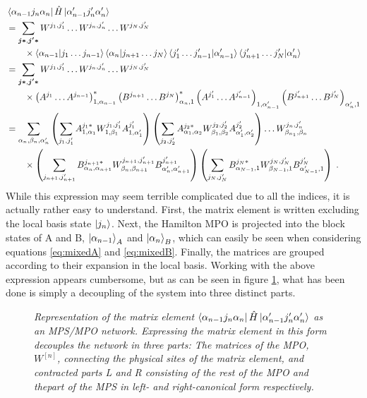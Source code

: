 \begin{align}
&	\bra{\alpha_{n-1} j_n \alpha_{n}} \hat{H} \ket{\alpha_{n-1} ' j_n ' \alpha_{n} '} \nonumber \\
 &= \sum_{\boldsymbol{j *} , \boldsymbol{j' * }}  W^{j_1 , j_1 '} \ldots W^{j_n , j_n '} \ldots W^{j_N , j_N '} \nonumber \\
	& \qquad \times \braket{\alpha_{n-1} | j_1 \ldots j_{n-1}} \braket{\alpha_{n} | j_{n+1} \ldots j_{N}} \braket{j_1 ' \ldots j_{n-1} ' | \alpha_{n-1} '} \braket{j_{n+1} ' \ldots j_{N} ' | \alpha_{n} '} \nonumber \\
	&= \sum_{\boldsymbol{j *} , \boldsymbol{j' * }}  W^{j_1 , j_1 '} \ldots W^{j_n , j_n '} \ldots W^{j_N , j_N '} \nonumber \\
	& \qquad \times \left( A^{j_1} \ldots A^{j_{n-1}} \right)_{1 , \alpha_{n-1}}^{*} \left( B^{j_{n+1}} \ldots B^{j_{N}} \right)_{ \alpha_{n} , 1}^{*} \left( A^{j_1 '} \ldots A^{j_{n-1} '} \right)_{1 , \alpha_{n-1} '} \left( B^{j_{n+1} '} \ldots B^{j_{N} '} \right)_{ \alpha_{n} ' , 1} \nonumber \\
	&= \sum_{\alpha_n , \beta_n , \alpha_n '}
	\left( \sum_{j_1 , j_1 '} A_{1 , \alpha_1}^{j_1 *} W_{1, \beta_1}^{j_1 , j_1 '} A_{1 , \alpha_1 '}^{j_1 '} \right)
	\left( \sum_{j_2 , j_2 '} A_{\alpha_1 , \alpha_2}^{j_2 *} W_{\beta_1, \beta_2}^{j_2 , j_2 '} A_{\alpha_1 ' , \alpha_2 '}^{j_2 '} \right)
	\ldots W_{\beta_{n_1}, \beta_n}^{j_n , j_n '} \nonumber \\
	& \qquad \times \left( \sum_{j_{n+1} , j_{n+1} '} B_{\alpha_n , \alpha_{n+1}}^{j_{n+1} *} W_{\beta_n, \beta_{n+1}}^{j_{n+1} , j_{n+1} '} B_{\alpha_n ', \alpha_{n+1} '}^{j_{n+1} '} \right)
	\left( \sum_{j_{N} , j_{N} '} B_{\alpha_{N-1} , 1}^{j_{N} *} W_{\beta_{N-1}, 1}^{j_{N} , j_{N} '} B_{\alpha_{N-1}' , 1 }^{j_{N} '} \right) \nonumber \; .
\end{align}  
While this expression may seem terrible complicated due to all the indices, it is actually rather easy to understand. First, the matrix element is written excluding the local basis state $\ket{j_n}$. Next, the Hamilton MPO is projected into the block states of A and B, $\ket{\alpha_{n-1}}_A$ and $\ket{\alpha_{n}}_B$, which can easily be seen when considering equations \ref{eq:mixedA} and \ref{eq:mixedB}. Finally, the matrices are grouped according to their expansion in the local basis. Working with the above expression appears cumbersome, but as can be seen in figure \ref{fig:singleElemHamil}, what has been done is simply a decoupling of the system into three distinct parts.
\begin{figure}[h!]
	\centering
	
	\caption{\textit{Representation of the matrix element $\bra{\alpha_{n-1} j_n \alpha_{n}} \hat{H} \ket{\alpha_{n-1} ' j_n ' \alpha_{n} '}$ as an MPS/MPO network. Expressing the matrix element in this form decouples the network in three parts: The matrices of the MPO, $W^{[n]}$, connecting the physical sites of the matrix element, and contracted parts L and R consisting of the rest of the MPO and thepart of the MPS in left- and right-canonical form respectively.}}
	\label{fig:singleElemHamil}
\end{figure}
